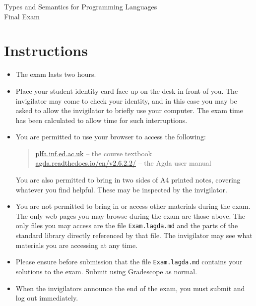 \documentclass[12pt]{article}
\begin{document}
\pagestyle{empty}
\setcounter{page}{1}

\begin{center}
\Large Types and Semantics for Programming Languages \\
\LARGE Final Exam
\end{center}

\section*{Instructions}

\begin{itemize}

\item
  The exam lasts two hours.

\item
  Place your student identity card face-up on the desk in front of you.  The
  invigilator may come to check your identity, and in this case you may be asked
  to allow the invigilator to briefly use your computer.  The exam time has been
  calculated to allow time for such interruptions.

\item
  You are permitted to use your browser to access the following:
  \begin{quote}
    \url{plfa.inf.ed.ac.uk} -- the course textbook \\
    \url{agda.readthedocs.io/en/v2.6.2.2/} -- the Agda user manual
  \end{quote}
  You are also permitted to bring in two sides of A4 printed notes,
  covering whatever you find helpful. These may be inspected by the
  invigilator.

\item
  You are not permitted to bring in or access other materials during
  the exam. The only web pages you may browse during the exam are
  those above. The only files you may access are the file \texttt{Exam.lagda.md}
  and the parts of the standard library directly referenced by
  that file. The invigilator may see what materials you are accessing
  at any time.

\item
  Please ensure before submission that the file
  \texttt{Exam.lagda.md} contains your solutions to the exam.
  Submit using Gradescope as normal.

\item
  When the invigilators announce the end of the exam, you must
  submit and log out immediately.

\end{itemize}
\end{document}
